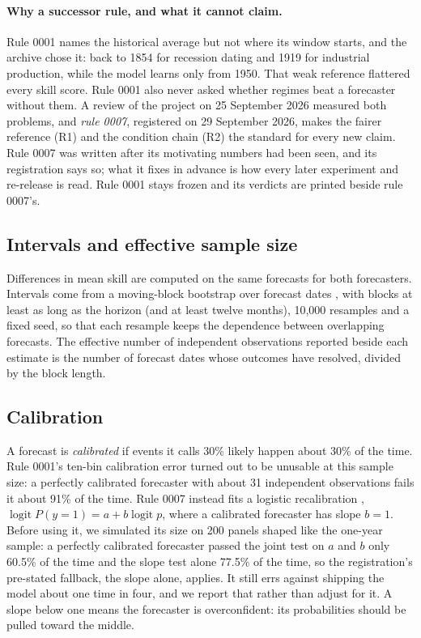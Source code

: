 \documentclass[11pt]{article}
\begin{document}
\paragraph{Why a successor rule, and what it cannot claim.} Rule 0001 names the historical average but
not where its window starts, and the archive chose it: back to 1854 for recession dating and 1919 for
industrial production, while the model learns only from 1950. That weak reference flattered every skill
score. Rule 0001 also never asked whether regimes beat a forecaster without them. A review of the
project on 25 September 2026 measured both problems, and \emph{rule 0007}, registered on 29 September
2026, makes the fairer reference (R1) and the condition chain (R2) the standard for every new claim. Rule
0007 was written after its motivating numbers had been seen, and its registration says so; what it fixes
in advance is how every later experiment and re-release is read. Rule 0001 stays frozen and its verdicts
are printed beside rule 0007's.

\subsection{Intervals and effective sample size}

Differences in mean skill are computed on the same forecasts for both forecasters. Intervals come from a
moving-block bootstrap over forecast dates \citep{kunsch1989jackknife}, with blocks at least as long as
the horizon (and at least twelve months), 10,000 resamples and a fixed seed, so that each resample keeps
the dependence between overlapping forecasts. The effective number of independent observations reported
beside each estimate is the number of forecast dates whose outcomes have resolved, divided by the block
length.

\subsection{Calibration}\label{sec:calibration}

A forecast is \emph{calibrated} if events it calls 30\% likely happen about 30\% of the time. Rule
0001's ten-bin calibration error turned out to be unusable at this sample size: a perfectly calibrated
forecaster with about 31 independent observations fails it about 91\% of the time. Rule 0007 instead fits
a logistic recalibration \citep{cox1958two}, $\operatorname{logit} P(y = 1) = a + b \operatorname{logit}
p$, where a calibrated forecaster has slope $b = 1$. Before using it, we simulated its size on 200
panels shaped like the one-year sample: a perfectly calibrated forecaster passed the joint test on
$a$ and $b$ only 60.5\% of the time and the slope test alone 77.5\% of the time, so the registration's
pre-stated fallback, the slope alone, applies. It still errs against shipping the model about one time
in four, and we report that rather than adjust for it. A slope below one means the forecaster is
overconfident: its probabilities should be pulled toward the middle.
\end{document}
